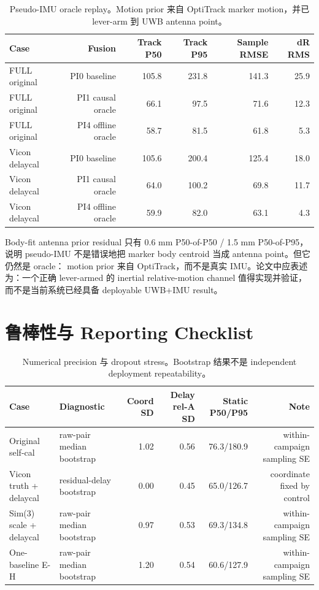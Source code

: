 \documentclass[UTF8,11pt,a4paper]{ctexart}
\newcommand{\tight}{\setlength{\tabcolsep}{4pt}\renewcommand{\arraystretch}{1.12}}
\begin{document}
\begin{table}[H]
\centering
\tight
\caption{Pseudo-IMU oracle replay。Motion prior 来自 OptiTrack marker motion，并已 lever-arm 到 UWB antenna point。}
\begin{tabular}{lrrrrr}
\toprule
Case & Fusion & Track P50 & Track P95 & Sample RMSE & dR RMS \\
\midrule
FULL original & PI0 baseline & 105.8 & 231.8 & 141.3 & 25.9 \\
FULL original & PI1 causal oracle & 66.1 & 97.5 & 71.6 & 12.3 \\
FULL original & PI4 offline oracle & 58.7 & 81.5 & 61.8 & 5.3 \\
Vicon delaycal & PI0 baseline & 105.6 & 200.4 & 125.4 & 18.0 \\
Vicon delaycal & PI1 causal oracle & 64.0 & 100.2 & 69.8 & 11.7 \\
Vicon delaycal & PI4 offline oracle & 59.9 & 82.0 & 63.1 & 4.3 \\
\bottomrule
\end{tabular}
\end{table}

Body-fit antenna prior residual 只有 0.6 mm P50-of-P50 / 1.5 mm P50-of-P95，
说明 pseudo-IMU 不是错误地把 marker body centroid 当成 antenna point。但它仍然是 oracle：
motion prior 来自 OptiTrack，而不是真实 IMU。论文中应表述为：一个正确 lever-armed 的 inertial
relative-motion channel 值得实现并验证，而不是当前系统已经具备 deployable UWB+IMU result。

\section{鲁棒性与 Reporting Checklist}

\begin{table}[H]
\centering
\tight
\caption{Numerical precision 与 dropout stress。Bootstrap 结果不是 independent deployment repeatability。}
\begin{tabularx}{\textwidth}{lXrrrr}
\toprule
Case & Diagnostic & Coord SD & Delay rel-A SD & Static P50/P95 & Note \\
\midrule
Original self-cal & raw-pair median bootstrap & 1.02 & 0.56 & 76.3/180.9 & within-campaign sampling SE \\
Vicon truth + delaycal & residual-delay bootstrap & 0.00 & 0.45 & 65.0/126.7 & coordinate fixed by control \\
Sim(3) scale + delaycal & raw-pair median bootstrap & 0.97 & 0.53 & 69.3/134.8 & within-campaign sampling SE \\
One-baseline E-H & raw-pair median bootstrap & 1.20 & 0.54 & 60.6/127.9 & within-campaign sampling SE \\
\bottomrule
\end{tabularx}
\end{table}
\end{document}

